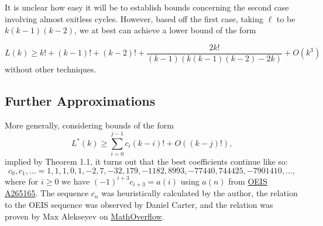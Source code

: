 \documentclass{article}
\theoremstyle{definition}
\newcommand{\hide}[1]{}
\newcommand{\edit}[1]{\textcolor{red}{#1}}
\newcommand{\hides}[1]{}%
\begin{document}
It is unclear how easy it will be to establish bounds concerning the second case involving almost exitless cycles. However, based off the first case, taking $\ell$ to be $k(k-1)(k-2)$, we at best can achieve a lower bound of the form

\[ L(k) \geq k!+(k-1)!+(k-2)! + \frac{2k!}{(k-1)(k(k-1)(k-2)-2k)} + O(k^3)\]
without other techniques.

\hides{\subsection{Further applications} \label{further}

We believe it is would also be interesting to solve 

\begin{itemize}
    \item Random model of $\mathcal{S}_k$. I believe it would be manageable to get decent bounds on models where the weights of edges in 1-cycles have change according to some probablity space.
    \item Fixed modifications of $\mathcal{S}_k$, where we remove some edges. For example, if we consider the case in which we only have the edges $\sigma$ and $\tau$, we immediately get that Greg Egan's upper bound is tight within an error of $1+1/(k-2)$. (In other literature it has shown to be absolutely tight in this case.)\edit{ maybe cite this result}
    \item Other subgraphs of the De Brujin graph
    \item Weighted pancake graph
\end{itemize}}
\subsection{Further Approximations} \label{comput}
More generally, considering bounds of the form
\[L^*(k)\ge \sum_{i=0}^{j-1} c_i(k-i)! + O((k-j)!),\]
implied by Theorem 1.1, it turns out that the best coefficients continue like so:
\[c_0,c_1,\dots = 1,1,1,0,1,-2,7,-32,179,-1182,8993,-77440,744425,-7901410,\dots,\]
where for $i\ge 0$ we have $(-1)^{i+3}c_{i+3} = a(i)$ using $a(n)$ from \href{https://oeis.org/A265165}{OEIS A265165}. The sequence $c_n$ was heuristically calculated by the author, the relation to the OEIS sequence was observed by Daniel Carter, and the relation was proven by Max Alekseyev on \href{https://mathoverflow.net/q/378215}{MathOverflow}.

\hide{using the cite feature on MathOverflow: @MISC {378215,
    TITLE = {Why does this &quot;factorial sequence&quot; appear in the OEIS?},
    AUTHOR = {Max Alekseyev (https://mathoverflow.net/users/7076/max-alekseyev)},
    HOWPUBLISHED = {MathOverflow},
    NOTE = {URL:https://mathoverflow.net/q/378215 (version: 2020-12-05)},
    EPRINT = {https://mathoverflow.net/q/378215},
    URL = {https://mathoverflow.net/q/378215}
}}
\end{document}
